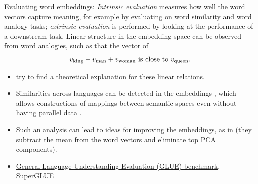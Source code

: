 \documentclass[11pt, a4paper]{amsart}
\begin{document}
\begin{enumerate}
    \underline{Evaluating word embeddings:}
    \newline
    \emph{Intrinsic evaluation} measures how well the word vectors capture meaning, for example by evaluating on word similarity and word analogy tasks;
    \emph{extrinsic evaluation} is performed by looking at the performance of a downstream task.
    Linear structure in the embedding space can be observed from word analogies, such as that the vector of
    \[
        v_{\textup{king}} - v_{\textup{man}} + v_{\textup{woman}} \text{ is close to } v_{\textup{queen}}.
    \]
    \begin{itemize}
        \item \cite{DBLP:journals/corr/abs-1901-09813} try to find a theoretical explanation for these linear relations.
        \item Similarities across languages can be detected in the embeddings \cite{DBLP:journals/corr/MikolovLS13}, which allows constructions of mappings between semantic spaces even without having parallel data \cite{DBLP:journals/corr/abs-1710-04087}.
        \item Such an analysis can lead to ideas for improving the embeddings, as in \cite{DBLP:journals/corr/MuBV17} (they subtract the mean from the word vectors and eliminate top PCA components).
        \item \href{https://gluebenchmark.com/}{General Language Understanding Evaluation (GLUE) benchmark}, \href{https://super.gluebenchmark.com/}{SuperGLUE}
    \end{itemize}
    

\end{enumerate}
\end{document}
